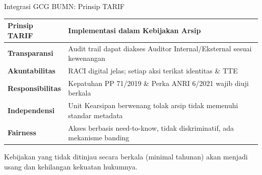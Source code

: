 \documentclass[aspectratio=169,11pt]{beamer}
\begin{document}
\begin{frame}{Integrasi GCG BUMN: Prinsip TARIF}
    \vspace{0.1cm}
    \centering
    \scriptsize
    \begin{tabularx}{\textwidth}{@{} l X @{}}
        \toprule
        \textbf{Prinsip TARIF} & \textbf{Implementasi dalam Kebijakan Arsip} \\
        \midrule
        \rowcolor{rowalt}
        \textbf{Transparansi} & Audit trail dapat diakses Auditor Internal/Eksternal sesuai kewenangan \\
        \textbf{Akuntabilitas} & RACI digital jelas; setiap aksi terikat identitas \& TTE \\
        \rowcolor{rowalt}
        \textbf{Responsibilitas} & Kepatuhan PP 71/2019 \& Perka ANRI 6/2021 wajib diuji berkala \\
        \textbf{Independensi} & Unit Kearsipan berwenang tolak arsip tidak memenuhi standar metadata \\
        \rowcolor{rowalt}
        \textbf{Fairness} & Akses berbasis need-to-know, tidak diskriminatif, ada mekanisme banding \\
        \bottomrule
    \end{tabularx}
    
    \vspace{0.2cm}
    \begin{orangebox}
        \scriptsize Kebijakan yang tidak ditinjau secara berkala (minimal tahunan) akan menjadi usang dan kehilangan kekuatan hukumnya.
    \end{orangebox}
\end{frame}
\end{document}
